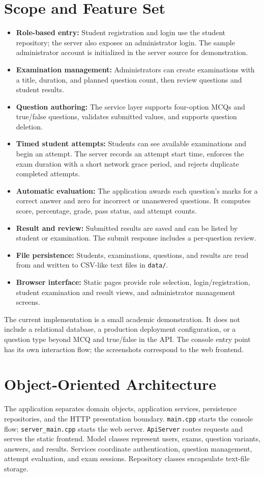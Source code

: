 \documentclass[12pt,a4paper,oneside]{book}
\begin{document}
\section{Scope and Feature Set}
\begin{itemize}
    \item \textbf{Role-based entry:} Student registration and login use the student repository; the server also exposes an administrator login. The sample administrator account is initialized in the server source for demonstration.
    \item \textbf{Examination management:} Administrators can create examinations with a title, duration, and planned question count, then review questions and student results.
    \item \textbf{Question authoring:} The service layer supports four-option MCQs and true/false questions, validates submitted values, and supports question deletion.
    \item \textbf{Timed student attempts:} Students can see available examinations and begin an attempt. The server records an attempt start time, enforces the exam duration with a short network grace period, and rejects duplicate completed attempts.
    \item \textbf{Automatic evaluation:} The application awards each question's marks for a correct answer and zero for incorrect or unanswered questions. It computes score, percentage, grade, pass status, and attempt counts.
    \item \textbf{Result and review:} Submitted results are saved and can be listed by student or examination. The submit response includes a per-question review.
    \item \textbf{File persistence:} Students, examinations, questions, and results are read from and written to CSV-like text files in \texttt{data/}.
    \item \textbf{Browser interface:} Static pages provide role selection, login/registration, student examination and result views, and administrator management screens.
\end{itemize}

The current implementation is a small academic demonstration. It does not include a relational database, a production deployment configuration, or a question type beyond MCQ and true/false in the API. The console entry point has its own interaction flow; the screenshots correspond to the web frontend.

\section{Object-Oriented Architecture}
The application separates domain objects, application services, persistence repositories, and the HTTP presentation boundary. \texttt{main.cpp} starts the console flow; \texttt{server\_main.cpp} starts the web server. \texttt{ApiServer} routes requests and serves the static frontend. Model classes represent users, exams, question variants, answers, and results. Services coordinate authentication, question management, attempt evaluation, and exam sessions. Repository classes encapsulate text-file storage.
\end{document}
